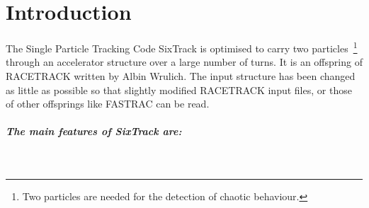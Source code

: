 
\chapter{Introduction} \label{Intro}

The Single Particle Tracking Code SixTrack is optimised to carry two particles~\footnote{Two particles are needed for the detection of  chaotic behaviour.} through an accelerator structure over a large number of turns.
It is an offspring of RACETRACK \cite{RACETRACK} written by Albin Wrulich.
The input structure has been changed as little as possible so that slightly modified RACETRACK input files, or those of other offsprings like FASTRAC \cite{FASTRAC} can be read.

\paragraph{The main features of SixTrack are:}~
